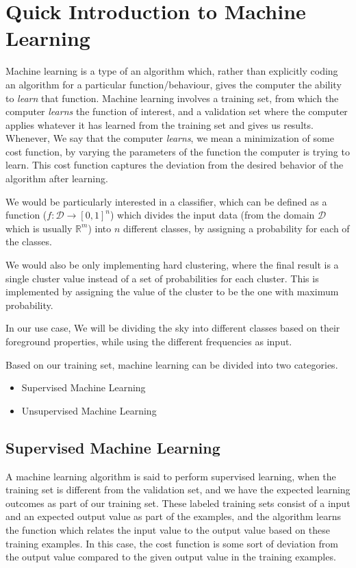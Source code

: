 \section{Quick Introduction to Machine Learning}
Machine learning is a type of an algorithm which, rather than explicitly coding an algorithm for a
particular function/behaviour, gives the computer the ability to \emph{learn} that function. Machine learning involves a
training set, from which the computer \emph{learns} the function of interest, and a validation set where the computer applies
whatever it has learned from the training set and gives us results.
Whenever, We say that the computer \emph{learns}, we mean a minimization of some cost function, by varying the parameters of the
function the computer is trying to learn. This cost function captures the deviation from the desired behavior of the
algorithm after learning. 

We would be particularly interested in a classifier,
which can be defined as a function ($f: \mathcal{D} \rightarrow [0,1]^n$) which divides the input data (from the domain $\mathcal{D}$
which is usually $\mathbb{R}^m$) into $n$ different classes, by assigning
a probability for each of the classes. 

We would also be only implementing hard clustering, where the final result is a single cluster value instead of a set of probabilities for each
cluster. This is implemented by assigning the value of the cluster to be the one with maximum probability. 

In our use case, We will be dividing the sky into different classes based on their foreground properties, while using the different frequencies
as input.

Based on our training set, machine learning can be divided into two categories.
\begin{itemize}
    \item Supervised Machine Learning
    \item Unsupervised Machine Learning
\end{itemize}

\subsection{Supervised Machine Learning}
A machine learning algorithm is said to perform supervised learning, when the training set is different from the validation set, and we
have the expected learning outcomes as part of our training set. These labeled training sets consist of a input and an expected output
value as part of the examples, and the algorithm learns the function which relates the input value to the output value based on these training examples.
In this case, the cost function is some sort of deviation from the output value compared to the given output value in the
training examples.

